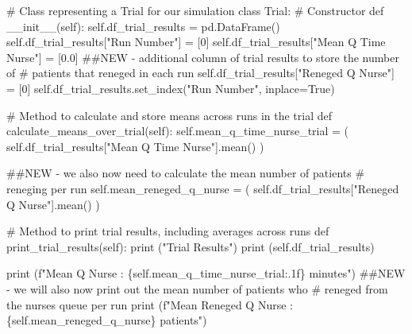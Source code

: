 \documentclass[
  letterpaper,
  DIV=11,
  numbers=noendperiod]{scrreprt}
\newenvironment{Shaded}{}{}
\newcommand{\BuiltInTok}[1]{\textcolor[rgb]{0.84,0.23,0.29}{#1}}
\newcommand{\CommentTok}[1]{\textcolor[rgb]{0.42,0.45,0.49}{#1}}
\newcommand{\DecValTok}[1]{\textcolor[rgb]{0.00,0.36,0.77}{#1}}
\newcommand{\FloatTok}[1]{\textcolor[rgb]{0.00,0.36,0.77}{#1}}
\newcommand{\FunctionTok}[1]{\textcolor[rgb]{0.44,0.26,0.76}{#1}}
\newcommand{\KeywordTok}[1]{\textcolor[rgb]{0.84,0.23,0.29}{#1}}
\newcommand{\NormalTok}[1]{\textcolor[rgb]{0.14,0.16,0.18}{#1}}
\newcommand{\OperatorTok}[1]{\textcolor[rgb]{0.14,0.16,0.18}{#1}}
\newcommand{\SpecialCharTok}[1]{\textcolor[rgb]{0.00,0.36,0.77}{#1}}
\newcommand{\SpecialStringTok}[1]{\textcolor[rgb]{0.01,0.18,0.38}{#1}}
\newcommand{\StringTok}[1]{\textcolor[rgb]{0.01,0.18,0.38}{#1}}
\newcommand{\VariableTok}[1]{\textcolor[rgb]{0.89,0.38,0.04}{#1}}
\begin{document}
\begin{tcolorbox}
\begin{Shaded}
\begin{Highlighting}[]
\CommentTok{\# Class representing a Trial for our simulation}
\KeywordTok{class}\NormalTok{ Trial:}
    \CommentTok{\# Constructor}
    \KeywordTok{def}  \FunctionTok{\_\_init\_\_}\NormalTok{(}\VariableTok{self}\NormalTok{):}
        \VariableTok{self}\NormalTok{.df\_trial\_results }\OperatorTok{=}\NormalTok{ pd.DataFrame()}
        \VariableTok{self}\NormalTok{.df\_trial\_results[}\StringTok{"Run Number"}\NormalTok{] }\OperatorTok{=}\NormalTok{ [}\DecValTok{0}\NormalTok{]}
        \VariableTok{self}\NormalTok{.df\_trial\_results[}\StringTok{"Mean Q Time Nurse"}\NormalTok{] }\OperatorTok{=}\NormalTok{ [}\FloatTok{0.0}\NormalTok{]}
        \CommentTok{\#\#NEW {-} additional column of trial results to store the number of}
        \CommentTok{\# patients that reneged in each run}
        \VariableTok{self}\NormalTok{.df\_trial\_results[}\StringTok{"Reneged Q Nurse"}\NormalTok{] }\OperatorTok{=}\NormalTok{ [}\DecValTok{0}\NormalTok{]}
        \VariableTok{self}\NormalTok{.df\_trial\_results.set\_index(}\StringTok{"Run Number"}\NormalTok{, inplace}\OperatorTok{=}\VariableTok{True}\NormalTok{)}

    \CommentTok{\# Method to calculate and store means across runs in the trial}
    \KeywordTok{def}\NormalTok{ calculate\_means\_over\_trial(}\VariableTok{self}\NormalTok{):}
        \VariableTok{self}\NormalTok{.mean\_q\_time\_nurse\_trial }\OperatorTok{=}\NormalTok{ (}
            \VariableTok{self}\NormalTok{.df\_trial\_results[}\StringTok{"Mean Q Time Nurse"}\NormalTok{].mean()}
\NormalTok{        )}

        \CommentTok{\#\#NEW {-} we also now need to calculate the mean number of patients}
        \CommentTok{\# reneging per run}
        \VariableTok{self}\NormalTok{.mean\_reneged\_q\_nurse }\OperatorTok{=}\NormalTok{ (}
            \VariableTok{self}\NormalTok{.df\_trial\_results[}\StringTok{"Reneged Q Nurse"}\NormalTok{].mean()}
\NormalTok{        )}

    \CommentTok{\# Method to print trial results, including averages across runs}
    \KeywordTok{def}\NormalTok{ print\_trial\_results(}\VariableTok{self}\NormalTok{):}
        \BuiltInTok{print}\NormalTok{ (}\StringTok{"Trial Results"}\NormalTok{)}
        \BuiltInTok{print}\NormalTok{ (}\VariableTok{self}\NormalTok{.df\_trial\_results)}

        \BuiltInTok{print}\NormalTok{ (}\SpecialStringTok{f"Mean Q Nurse : }\SpecialCharTok{\{}\VariableTok{self}\SpecialCharTok{.}\NormalTok{mean\_q\_time\_nurse\_trial}\SpecialCharTok{:.1f\}}\SpecialStringTok{ minutes"}\NormalTok{)}
        \CommentTok{\#\#NEW {-} we will also now print out the mean number of patients who}
        \CommentTok{\# reneged from the nurse\textquotesingle{}s queue per run}
        \BuiltInTok{print}\NormalTok{ (}\SpecialStringTok{f"Mean Reneged Q Nurse : }\SpecialCharTok{\{}\VariableTok{self}\SpecialCharTok{.}\NormalTok{mean\_reneged\_q\_nurse}\SpecialCharTok{\}}\SpecialStringTok{ patients"}\NormalTok{)}


\end{Highlighting}
\end{Shaded}
\end{tcolorbox}
\end{document}
